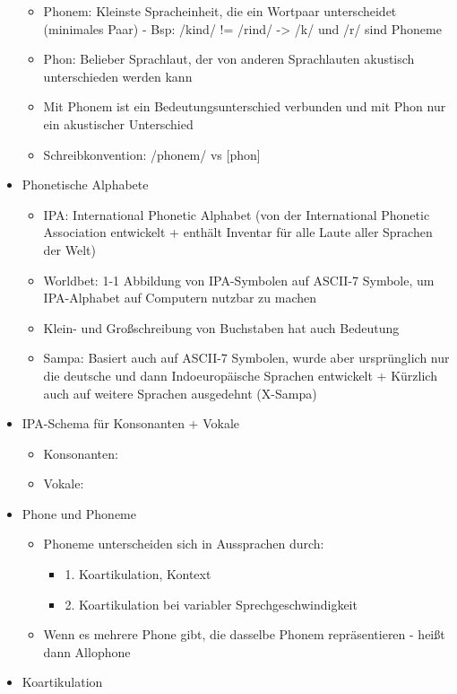 \documentclass[a4paper,10pt,oneside]{article}
\begin{document}
\begin{itemize}
\begin{itemize}
				\item Phonem: Kleinste Spracheinheit, die ein Wortpaar unterscheidet (minimales Paar) - Bsp: /kind/ != /rind/ -> /k/ und /r/ sind Phoneme
				\item Phon: Belieber Sprachlaut, der von anderen Sprachlauten akustisch unterschieden werden kann 
				\item Mit Phonem ist ein Bedeutungsunterschied verbunden und mit Phon nur ein akustischer Unterschied
				\item Schreibkonvention: /phonem/ vs [phon]
			\end{itemize}
		\item Phonetische Alphabete
			\begin{itemize}
				\item IPA: International Phonetic Alphabet (von der International Phonetic Association entwickelt + enthält Inventar für alle Laute aller Sprachen der Welt)
				\item Worldbet: 1-1 Abbildung von IPA-Symbolen auf ASCII-7 Symbole, um IPA-Alphabet auf Computern nutzbar zu machen
				\item Klein- und Großschreibung von Buchstaben hat auch Bedeutung
				\item Sampa: Basiert auch auf ASCII-7 Symbolen, wurde aber ursprünglich nur die deutsche und dann Indoeuropäische Sprachen entwickelt + Kürzlich auch auf weitere Sprachen ausgedehnt (X-Sampa)
			\end{itemize}
		\item IPA-Schema für Konsonanten + Vokale
			\begin{itemize}
				\item[] Konsonanten: %
				\item[] Vokale: %
			\end{itemize}
		\item Phone und Phoneme 
			\begin{itemize}
				\item Phoneme unterscheiden sich in Aussprachen durch:
					\begin{itemize}
						\item 1. Koartikulation, Kontext
						\item 2. Koartikulation bei variabler Sprechgeschwindigkeit
					\end{itemize}
				\item Wenn es mehrere Phone gibt, die dasselbe Phonem repräsentieren - heißt dann Allophone
			\end{itemize}
		\item Koartikulation

\end{itemize}
\end{document}
